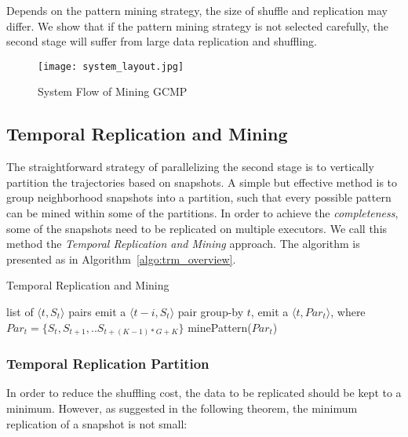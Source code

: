 Depends on the pattern mining strategy, the size of shuffle and replication may differ. We show that if the pattern mining strategy is not selected carefully, the second stage will suffer from large data replication and shuffling.


\begin{figure} [h]
\center
\texttt{[image: system\_layout.jpg]}
\caption{System Flow of Mining GCMP}
\label{fig:overview}
\end{figure}



\subsection{Temporal Replication and Mining}
The straightforward strategy of parallelizing the second stage is to vertically partition the trajectories based on snapshots. 
A simple but effective method
is to group neighborhood snapshots into a partition, such that every possible pattern can be mined within some of the partitions. In order to achieve the \emph{completeness},
some of the snapshots need to be replicated on multiple executors.
We call this method the \emph{Temporal Replication and Mining} approach. 
The algorithm is presented as in Algorithm~\ref{algo:trm_overview}.

\begin{algorithm}
\caption{Temporal Replication and Mining}
\label{algo:trm_overview}
\begin{algorithmic}
\Require list of $\langle t, S_t \rangle$ pairs
		\State emit a $\langle t-i, S_t \rangle$ pair
	\EndFor 
\EndFor
{}
\State group-by $t$, emit a $\langle t, Par_t\rangle$,
\State  where $Par_t = \{S_t, S_{t+1}, .. S_{t+(K-1)*G+K}\} $
\EndFor
{}
\State minePattern($Par_t$)
\EndFor

\end{algorithmic}
\end{algorithm}


\subsubsection{Temporal Replication Partition}
In order to reduce the shuffling cost, the data to be replicated should be
kept to a minimum. However, as suggested in the following theorem, the minimum replication of a snapshot is not small:

